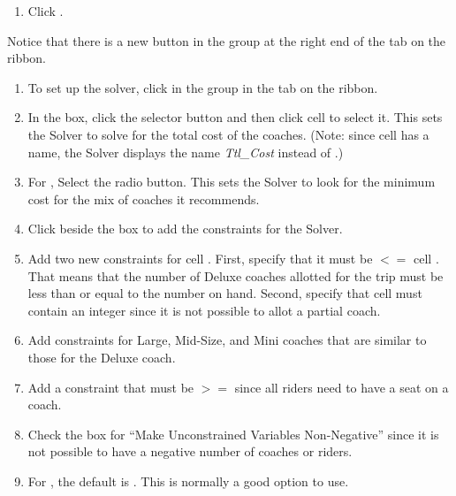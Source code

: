 \begin{enumerate}[resume]	
	\item Click .
\end{enumerate}

Notice that there is a new  button in the  group at the right end of the  tab on the ribbon.

\begin{enumerate}[resume]
	\item To set up the solver, click  in the  group in the  tab on the ribbon. 
	\item In the  box, click the selector button and then click cell  to select it. This sets the Solver to solve for the total cost of the coaches. (Note: since cell  has a name, the Solver displays the name \textit{Ttl\_Cost} instead of .)
	\item For , Select the  radio button. This sets the Solver to look for the minimum cost for the mix of coaches it recommends.
	\item Click  beside the  box to add the constraints for the Solver.
	\item Add two new constraints for cell . First, specify that it must be $ <= $ cell . That means that the number of Deluxe coaches allotted for the trip must be less than or equal to the number on hand. Second, specify that cell  must contain an integer since it is not possible to allot a partial coach.
	\item Add constraints for Large, Mid-Size, and Mini coaches that are similar to those for the Deluxe coach.
	\item Add a constraint that  must be $ >= $  since all riders need to have a seat on a coach.
	\item Check the box for ``Make Unconstrained Variables Non-Negative'' since it is not possible to have a negative number of coaches or riders.
	 \item For , the default is . This is normally a good option to use.
	 
\end{enumerate}

